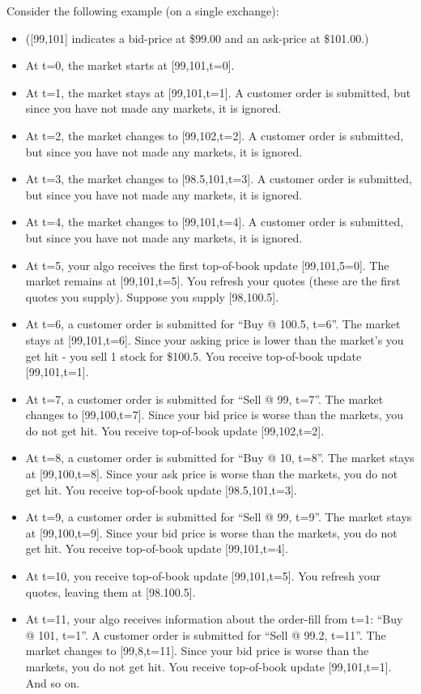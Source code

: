 \documentclass[12pt]{article}
\begin{document}
Consider the following example (on a single exchange):
\begin{itemize}
  \item ([99,101] indicates a bid-price at \$99.00 and an ask-price at \$101.00.)
  \item At t=0, the market starts at [99,101,t=0].
  \item At t=1, the market stays at [99,101,t=1]. A customer order is submitted, but since you have not made any markets, it is ignored.
  \item At t=2, the market changes to [99,102,t=2]. A customer order is submitted, but since you have not made any markets, it is ignored.
  \item At t=3, the market changes to [98.5,101,t=3]. A customer order is submitted, but since you have not made any markets, it is ignored.
  \item At t=4, the market changes to [99,101,t=4]. A customer order is submitted, but since you have not made any markets, it is ignored.
  \item At t=5, your algo receives the first top-of-book update [99,101,5=0]. The market remains at [99,101,t=5]. You refresh your quotes (these are the first quotes you supply). Suppose you supply [98,100.5].
  \item At t=6, a customer order is submitted for “Buy @ 100.5, t=6”. The market stays at [99,101,t=6]. Since your asking price is lower than the market’s you get hit - you sell 1 stock for \$100.5. You receive top-of-book update [99,101,t=1].
  \item At t=7, a customer order is submitted for “Sell @ 99, t=7”. The market changes to [99,100,t=7]. Since your bid price is worse than the markets, you do not get hit. You receive top-of-book update [99,102,t=2].
  \item At t=8, a customer order is submitted for “Buy @ 10, t=8”. The market stays at [99,100,t=8]. Since your ask price is worse than the markets, you do not get hit. You receive top-of-book update [98.5,101,t=3].
  \item At t=9, a customer order is submitted for “Sell @ 99, t=9”. The market stays at [99,100,t=9]. Since your bid price is worse than the markets, you do not get hit. You receive top-of-book update [99,101,t=4].
  \item At t=10, you receive top-of-book update [99,101,t=5]. You refresh your quotes, leaving them at [98.100.5]. 
  \item At t=11, your algo receives information about the order-fill from t=1: “Buy @ 101, t=1”. A customer order is submitted for “Sell @ 99.2, t=11”. The market changes to [99,8,t=11]. Since your bid price is worse than the markets, you do not get hit. You receive top-of-book update [99,101,t=1]. 
And so on.
\end{itemize}
\end{document}
